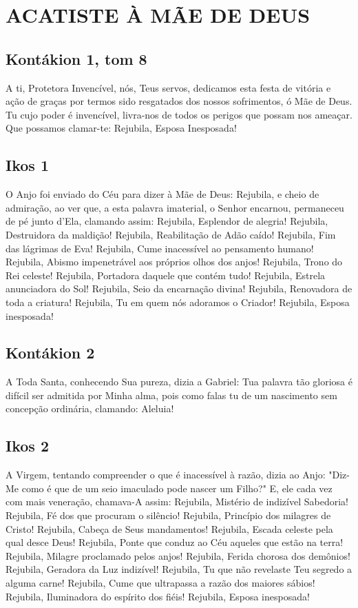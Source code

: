 \documentclass{subfiles}
\begin{document}
\chapter{ACATISTE À MÃE DE DEUS}

\section*{Kontákion 1, tom 8}

A ti, Protetora Invencível, nós, Teus servos, dedicamos esta festa de
vitória e ação de graças por termos sido resgatados dos nossos sofrimentos, ó
Mãe de Deus. Tu cujo poder é invencível, livra-nos de todos os perigos que
possam nos ameaçar. Que possamos clamar-te: Rejubila, Esposa Inesposada!

\section*{Ikos 1}

O Anjo foi enviado do Céu para dizer à Mãe de Deus: Rejubila, e cheio
de admiração, ao ver que, a esta palavra imaterial, o Senhor encarnou,
permaneceu de pé junto d'Ela, clamando assim:
Rejubila, Esplendor de alegria!
Rejubila, Destruidora da maldição!
Rejubila, Reabilitação de Adão caído!
Rejubila, Fim das lágrimas de Eva!
Rejubila, Cume inacessível ao pensamento humano!
Rejubila, Abismo impenetrável aos próprios olhos dos anjos!
Rejubila, Trono do Rei celeste!
Rejubila, Portadora daquele que contém tudo!
Rejubila, Estrela anunciadora do Sol!
Rejubila, Seio da encarnação divina!
Rejubila, Renovadora de toda a criatura!
Rejubila, Tu em quem nós adoramos o Criador!
Rejubila, Esposa inesposada!


\section*{Kontákion 2}

A Toda Santa, conhecendo Sua pureza, dizia a Gabriel: Tua palavra tão
gloriosa é difícil ser admitida por Minha alma, pois como falas tu de um
nascimento sem concepção ordinária, clamando: Aleluia!

\section*{Ikos 2}

A Virgem, tentando compreender o que é inacessível à razão, dizia ao
Anjo: "Diz-Me como é que de um seio imaculado pode nascer um Filho?" E, ele
cada vez com mais veneração, chamava-A assim:
Rejubila, Mistério de indizível Sabedoria!
Rejubila, Fé dos que procuram o silêncio!
Rejubila, Princípio dos milagres de Cristo!
Rejubila, Cabeça de Seus mandamentos!
Rejubila, Escada celeste pela qual desce Deus!
Rejubila, Ponte que conduz ao Céu aqueles que estão na terra!
Rejubila, Milagre proclamado pelos anjos!
Rejubila, Ferida chorosa dos demônios!
Rejubila, Geradora da Luz indizível!
Rejubila, Tu que não revelaste Teu segredo a alguma carne!
Rejubila, Cume que ultrapassa a razão dos maiores sábios!
Rejubila, Iluminadora do espírito dos fiéis!
Rejubila, Esposa inesposada!
\end{document}
